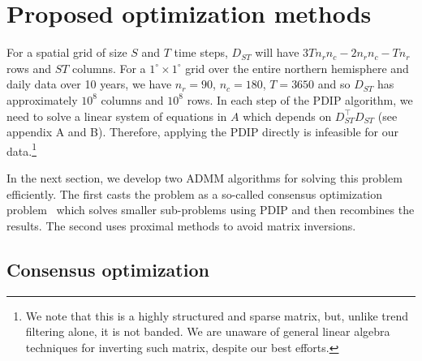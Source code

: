 \documentclass{article}
\DeclareMathOperator*{\argmin}{argmin}
\newcommand{\attn}[1]{\textcolor{red}{TODO: #1}}
\newcommand{\norm}[1]{\left\lVert #1 \right\rVert}
\begin{document}

\section{Proposed optimization methods}
\label{sec:prop-optim-meth}

For a spatial grid of size $S$ and $T$ time steps, $D_{ST}$ will have
$3Tn_rn_c-2n_rn_c-Tn_r$ rows and $ST$ columns. For a $1^\circ\times
1^\circ$ grid over the entire northern hemisphere and daily data over
10 years, we have $n_r=90$, $n_c=180$, $T=3650$ and so $D_{ST}$ has
approximately $10^8$ columns and $10^8$ rows. In each step of the PDIP
algorithm, we need to solve a linear system of equations in $A$ which
depends on $D_{ST}^\top D_{ST}$ (see appendix A and B). Therefore,
applying the PDIP directly is infeasible for our data.\footnote{We
  note that this is a highly structured and sparse matrix, but, unlike
  trend filtering alone, it is not banded. We are unaware of general
  linear algebra techniques for inverting such matrix, despite our
  best efforts.}  

In the next section, we develop two ADMM algorithms for solving this
problem efficiently. The first casts the problem as a
so-called consensus optimization problem~\citep{boyd_distributed_2011}
which solves smaller sub-problems using PDIP and then recombines the results. The
second uses proximal methods to avoid matrix inversions.
 

\subsection{Consensus optimization}
\label{sec:consOpt}

\end{document}

